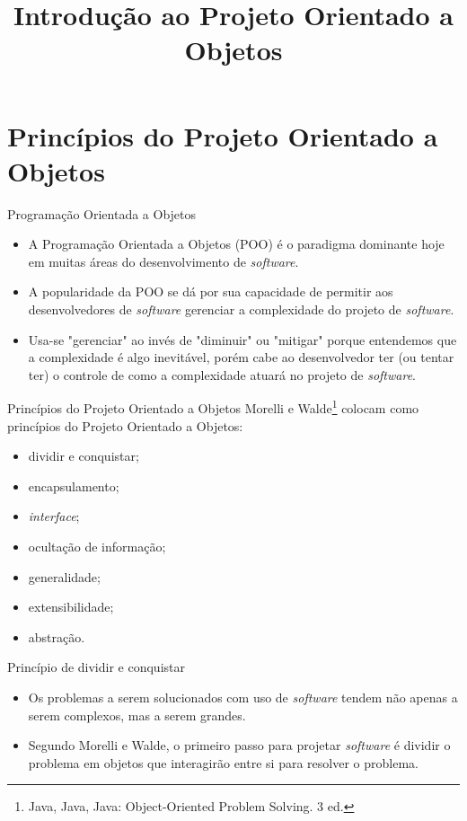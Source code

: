 \documentclass[11pt,justified]{beamer}
\title{Introdução ao Projeto Orientado a Objetos}
\author{}
\date{}
\begin{document}
\begin{frame}[plain]
    \titlepage
\end{frame}

\section{Princípios do Projeto Orientado a Objetos}

\begin{frame}{Programação Orientada a Objetos}
    \begin{itemize}
        \item A Programação Orientada a Objetos (POO) é o paradigma dominante hoje em muitas áreas do desenvolvimento de \textit{software}.
        \item A popularidade da POO se dá por sua capacidade de permitir aos desenvolvedores de \textit{software} gerenciar a complexidade do projeto de \textit{software}.
        \item Usa-se "gerenciar" ao invés de "diminuir" ou "mitigar" porque entendemos que a complexidade é algo inevitável, porém cabe ao desenvolvedor ter (ou tentar ter) o controle de como a complexidade atuará no projeto de \textit{software}.
    \end{itemize}
\end{frame}

\begin{frame}{Princípios do Projeto Orientado a Objetos}
    Morelli e Walde\footnote{Java, Java, Java: Object-Oriented Problem Solving. 3 ed.} colocam como princípios do Projeto Orientado a Objetos:
    \begin{itemize}
        \item dividir e conquistar;
        \item encapsulamento;
        \item \textit{interface};
        \item ocultação de informação;
        \item generalidade;
        \item extensibilidade;
        \item abstração.
    \end{itemize}
\end{frame}

\begin{frame}{Princípio de dividir e conquistar}
    \begin{itemize}
        \item Os problemas a serem solucionados com uso de \textit{software} tendem não apenas a serem complexos, mas a serem grandes.
        \item Segundo Morelli e Walde, o primeiro passo para projetar \textit{software} é dividir o problema em objetos que interagirão entre si para resolver o problema.
    \end{itemize}
\end{frame}
\end{document}
